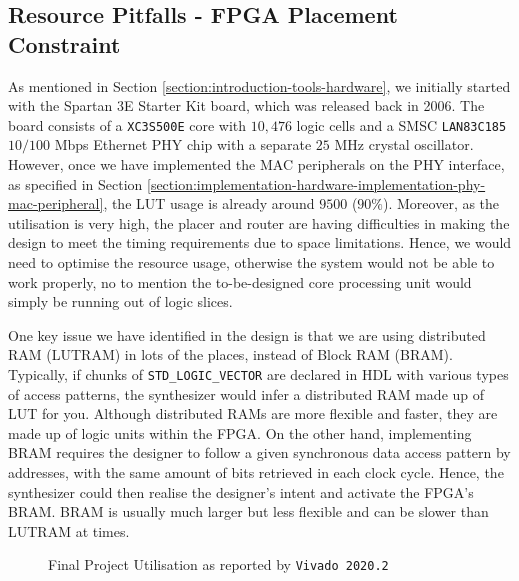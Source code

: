 \documentclass[a4paper]{report}
\newcommand{\code}{\texttt}
\begin{document}
\subsection{Resource Pitfalls - FPGA Placement Constraint}

As mentioned in Section \ref{section:introduction-tools-hardware}, we initially started with the Spartan 3E Starter Kit board, which was released back in 2006. The board consists of a \code{XC3S500E} core with $10,476$ logic cells and a SMSC \code{LAN83C185} $10/100$ Mbps Ethernet PHY chip with a separate $25$ MHz crystal oscillator. However, once we have implemented the MAC peripherals on the PHY interface, as specified in Section \ref{section:implementation-hardware-implementation-phy-mac-peripheral}, the LUT usage is already around $9500$ ($90\%$). Moreover, as the utilisation is very high, the placer and router are having difficulties in making the design to meet the timing requirements due to space limitations. Hence, we would need to optimise the resource usage, otherwise the system would not be able to work properly, no to mention the to-be-designed core processing unit would simply be running out of logic slices. 

One key issue we have identified in the design is that we are using distributed RAM (LUTRAM) in lots of the places, instead of Block RAM (BRAM). Typically, if chunks of \code{STD\_LOGIC\_VECTOR} are declared in HDL with various types of access patterns, the synthesizer would infer a distributed RAM made up of LUT for you. Although distributed RAMs are more flexible and faster, they are made up of logic units within the FPGA. On the other hand, implementing BRAM requires the designer to follow a given synchronous data access pattern by addresses, with the same amount of bits retrieved in each clock cycle. Hence, the synthesizer could then realise the designer's intent and activate the FPGA's BRAM. BRAM is usually much larger but less flexible and can be slower than LUTRAM at times. 

\begin{figure}[h!]
  \caption{Final Project Utilisation as reported by \code{Vivado 2020.2}}
  \label{fig:utilisation-fpga}
\end{figure}
\end{document}
